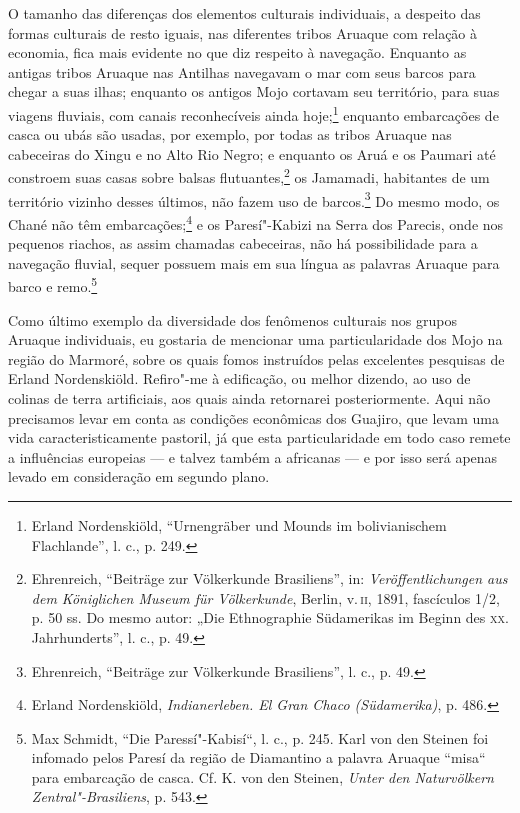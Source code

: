 O tamanho das diferenças dos elementos culturais individuais, a
despeito das formas culturais de resto iguais, nas diferentes tribos
Aruaque com relação à economia, fica mais evidente no que diz respeito
à navegação. Enquanto as antigas tribos Aruaque nas Antilhas navegavam
o mar com seus barcos para chegar a suas ilhas; enquanto os antigos Mojo
cortavam seu território, para suas viagens fluviais, com canais
reconhecíveis ainda hoje;\footnote{Erland Nordenskiöld, ``Urnengräber
  und Mounds im bolivianischem Flachlande'', l. c., p. 249.} enquanto
embarcações de casca ou ubás são usadas, por exemplo, por todas as
tribos Aruaque nas cabeceiras do Xingu e no Alto Rio Negro; e enquanto
os Aruá e os Paumari até constroem suas casas sobre balsas
flutuantes,\footnote{Ehrenreich, ``Beiträge zur Völkerkunde Brasiliens'',
  in: \emph{Veröffentlichungen aus dem Königlichen Museum für
  Völkerkunde}, Berlin, v.\,\textsc{ii}, 1891, fascículos 1/2, p. 50 ss. Do mesmo
  autor: „Die Ethnographie Südamerikas im Beginn des \textsc{xx}.
  Jahrhunderts'', l. c., p. 49.} os Jamamadi, habitantes de um
território vizinho desses últimos, não fazem uso de barcos.\footnote{Ehrenreich,
  ``Beiträge zur Völkerkunde Brasiliens'', l. c., p. 49.} Do mesmo
modo, os Chané não têm embarcações;\footnote{Erland Nordenskiöld,
  \emph{Indianerleben. El Gran Chaco (Südamerika)}, p. 486.} e os
Paresí"-Kabizi na Serra dos Parecis, onde nos pequenos riachos, as assim
chamadas cabeceiras, não há possibilidade para a navegação fluvial,
sequer possuem mais em sua língua as palavras Aruaque para barco e
remo.\footnote{Max Schmidt, ``Die Paressí"-Kabisí``, l. c., p. 245. Karl
  von den Steinen foi infomado pelos Paresí da região de Diamantino a
  palavra Aruaque ``misa`` para embarcação de casca. Cf. K. von den
  Steinen, \emph{Unter den Naturvölkern Zentral"-Brasiliens}, p. 543.}

Como último exemplo da diversidade dos fenômenos culturais nos grupos
Aruaque individuais, eu gostaria de mencionar uma particularidade dos
Mojo na região do Marmoré, sobre os quais fomos instruídos pelas
excelentes pesquisas de Erland Nordenskiöld. Refiro"-me à edificação, ou
melhor dizendo, ao uso de colinas de terra artificiais, aos quais ainda
retornarei posteriormente. Aqui não precisamos levar em conta as
condições econômicas dos Guajiro, que levam uma vida
caracteristicamente pastoril, já que esta particularidade em todo caso
remete a influências europeias --- e talvez também a africanas --- e por
isso será apenas levado em consideração em segundo plano.

